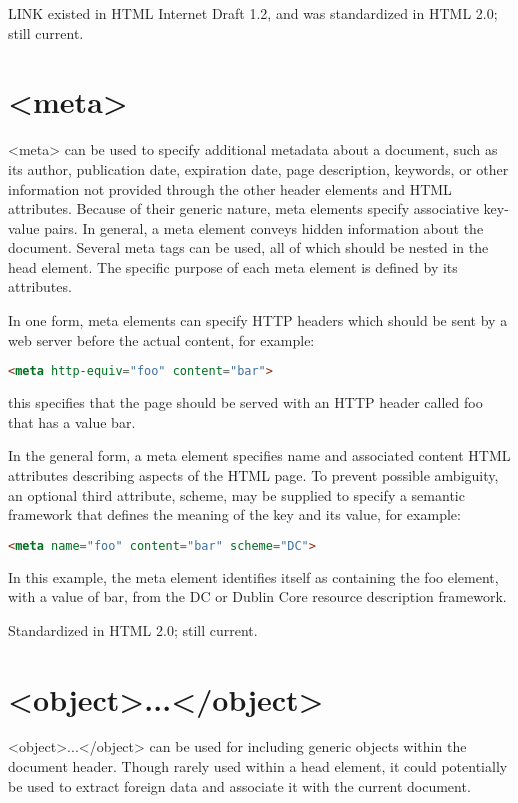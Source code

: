 LINK existed in HTML Internet Draft 1.2, and was standardized in HTML 2.0; still current.




\section{<meta>}

<meta> can be used to specify additional metadata about a document, such as its author, publication date, expiration date, page description, keywords, or other information not provided through the other header elements and HTML attributes. Because of their generic nature, meta elements specify associative key-value pairs. In general, a meta element conveys hidden information about the document. Several meta tags can be used, all of which should be nested in the head element. The specific purpose of each meta element is defined by its attributes.

In one form, meta elements can specify HTTP headers which should be sent by a web server before the actual content, for example:

\begin{lstlisting}[language=HTML]
<meta http-equiv="foo" content="bar">
\end{lstlisting}

this specifies that the page should be served with an HTTP header called foo that has a value bar.

In the general form, a meta element specifies name and associated content HTML attributes describing aspects of the HTML page. To prevent possible ambiguity, an optional third attribute, scheme, may be supplied to specify a semantic framework that defines the meaning of the key and its value, for example:

\begin{lstlisting}[language=HTML]
<meta name="foo" content="bar" scheme="DC">
\end{lstlisting}

In this example, the meta element identifies itself as containing the foo element, with a value of bar, from the DC or Dublin Core resource description framework.

Standardized in HTML 2.0; still current.


\section{<object>...</object>}


<object>...</object> can be used for including generic objects within the document header. Though rarely used within a head element, it could potentially be used to extract foreign data and associate it with the current document.

